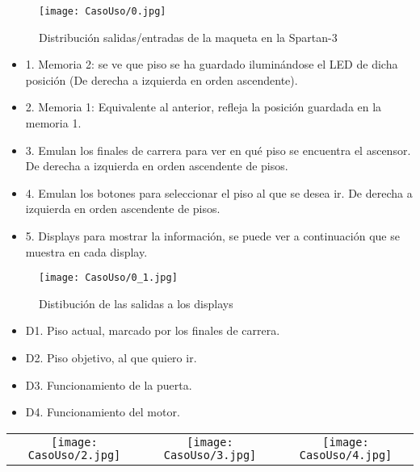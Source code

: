 	\begin{figure}[H]
        \centering
        \texttt{[image: CasoUso/0.jpg]}
        \caption{Distribución salidas/entradas de la maqueta en la Spartan-3}
        \label{fig:Spartan3Interfaz}
    \end{figure}
    
    
    \begin{itemize}
	    \item 1. Memoria 2: se ve que piso se ha guardado iluminándose el LED de dicha posición (De derecha a izquierda en orden ascendente).
	    \item 2. Memoria 1: Equivalente al anterior, refleja la posición guardada en la memoria 1.
	    \item 3. Emulan los finales de carrera para ver en qué piso se encuentra el ascensor. De derecha a izquierda en orden ascendente de pisos.
	    \item 4. Emulan los botones para seleccionar el piso al que se desea ir. De derecha a izquierda en orden ascendente de pisos.
	    \item 5. Displays para mostrar la información, se puede ver a continuación que se muestra en cada display.
	\end{itemize} 
	
	\begin{figure}[H]
        \centering
        \texttt{[image: CasoUso/0\_1.jpg]}
        \caption{Distibución de las salidas a los displays}
        \label{fig:Spartan3InterfazDisplays}
    \end{figure}
    
    \begin{itemize}
		    \item  D1. Piso actual, marcado por los finales de carrera.
		    \item  D2. Piso objetivo, al que quiero ir.
		    \item  D3. Funcionamiento de la puerta.
		    \item  D4. Funcionamiento del motor.
	\end{itemize} 
	
    
	\begin{table}[H]
	\centering
	\begin{tabular}{ccc}
		 \texttt{[image: CasoUso/2.jpg]}  & 
		 \texttt{[image: CasoUso/3.jpg]} & 
		 \texttt{[image: CasoUso/4.jpg]}   \\
	\end{tabular}
	\end{table}
	
